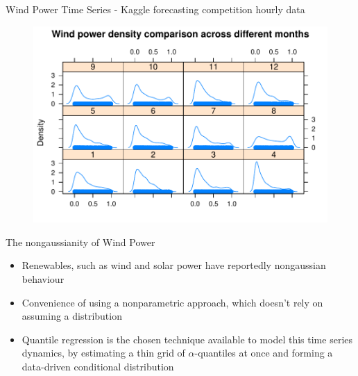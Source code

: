 \documentclass[11pt]{beamer}
\begin{document}
\begin{frame}{Wind Power Time Series - Kaggle forecasting competition
hourly data}

\begin{figure}
\centering
\includegraphics[width=0.9\linewidth]{Images/density}
\end{figure}

\end{frame}

\begin{frame}{The nongaussianity of Wind Power}

\begin{itemize}

\item
Renewables, such as wind and solar power have reportedly nongaussian
behaviour
\item
Convenience of using a nonparametric approach, which doesn't rely on
assuming a distribution
\item
Quantile regression is the chosen technique available to model this
time series dynamics, by estimating a thin grid of
\(\alpha\)-quantiles at once and forming a data-driven conditional
distribution
\end{itemize}

\end{frame}
\end{document}

